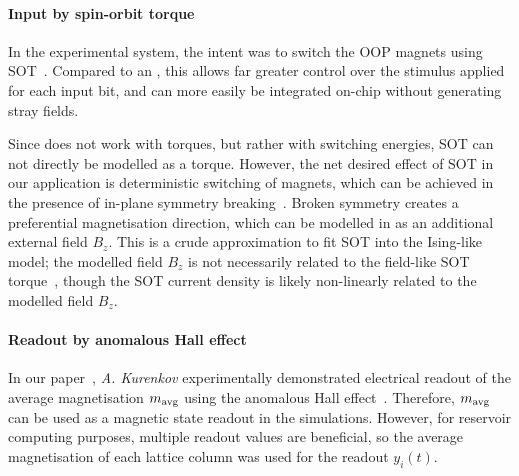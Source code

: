 \paragraph{Input by spin-orbit torque}
In the experimental system, the intent was to switch the OOP magnets using SOT~\cite{SOTswitchingCoPt}.
Compared to an , this allows far greater control over the stimulus applied for each input bit, and can more easily be integrated on-chip without generating stray fields. \par
Since \hotspice does not work with torques, but rather with switching energies, SOT can not directly be modelled as a torque.
However, the net desired effect of SOT in our application is deterministic switching of magnets, which can be achieved in the presence of in-plane symmetry breaking~\cite{SOT_Roadmap}. %
Broken symmetry creates a preferential magnetisation direction, which can be modelled in \hotspice as an additional external field $B_z$.
This is a crude approximation to fit SOT into the Ising-like model; the modelled field $B_z$ is not necessarily related to the field-like SOT torque~\cite{SOT_firstprinciplesCoPt}, though the SOT current density is likely non-linearly related to the modelled field $B_z$.

\paragraph{Readout by anomalous Hall effect}
In our paper~\cite{KUR-24}, \textit{A. Kurenkov} experimentally demonstrated electrical readout of the average magnetisation $m_\mathrm{avg}$ using the anomalous Hall effect~\cite{AHE}.
Therefore, $m_\mathrm{avg}$ can be used as a magnetic state readout in the simulations.
However, for reservoir computing purposes, multiple readout values are beneficial, so the average magnetisation of each lattice column was used for the readout $y_i(t)$. %

